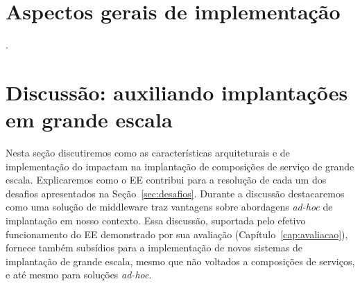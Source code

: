 \section{Aspectos gerais de implementação}

.

\section{Discussão: auxiliando implantações em grande escala}

Nesta seção discutiremos como as características arquiteturais e de implementação do \ee
impactam na implantação de composições de serviço de grande escala.
Explicaremos como o EE contribui para a resolução de cada um dos desafios
apresentados na Seção~\ref{sec:desafios}.
Durante a discussão destacaremos como uma solução de middleware traz vantagens
sobre abordagens \emph{ad-hoc} de implantação em nosso contexto.
Essa discussão, suportada pelo efetivo funcionamento do EE demonstrado por sua avaliação
(Capítulo~\ref{cap:avaliacao}), fornece também subsídios para a implementação de novos sistemas
de implantação de grande escala, mesmo que não voltados a composições de serviços,
e até mesmo para soluções \emph{ad-hoc}.

